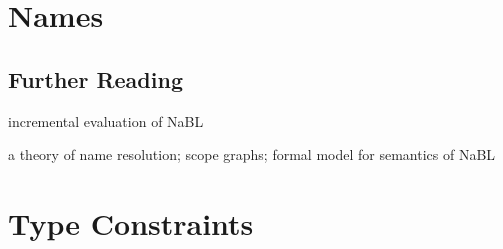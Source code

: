 \chapter{Names}

\section{Further Reading}

\cite{WachsmuthKVGV13} incremental evaluation of NaBL

\cite{NeronTVW15} a theory of name resolution; scope graphs; formal model for
semantics of NaBL


\chapter{Type Constraints}

